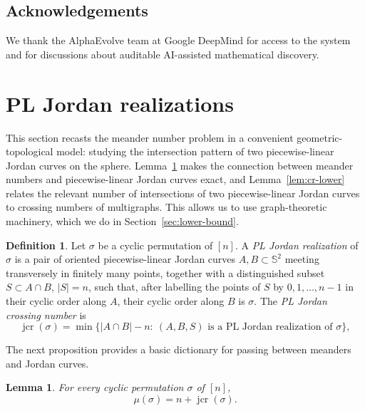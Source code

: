 \documentclass[11pt,a4paper]{amsart}
\newtheorem{lemma}[theorem]{Lemma}
\theoremstyle{definition}
\newtheorem{definition}[theorem]{Definition}
\theoremstyle{remark}
\DeclareMathOperator{\jcr}{jcr}
\begin{document}
\subsection*{Acknowledgements}

 We thank the AlphaEvolve team at Google DeepMind for access to the system and for discussions about auditable AI-assisted mathematical discovery.


\section{PL Jordan realizations}
\label{sec:pl-jordan}

This section recasts the meander number problem in a convenient geometric-topological model: studying the intersection pattern of two piecewise-linear Jordan curves on the sphere. Lemma~\ref{lem:exact} makes the connection between meander numbers and piecewise-linear Jordan curves exact, and Lemma~\ref{lem:cr-lower} relates the relevant number of intersections of two piecewise-linear Jordan curves to crossing numbers of multigraphs.  This allows us to use graph-theoretic machinery, which we do in Section~\ref{sec:lower-bound}.

\begin{definition}
Let $\sigma$ be a cyclic permutation of $[n]$.  A \emph{PL Jordan
realization} of $\sigma$ is a pair of oriented piecewise-linear Jordan
curves $A,B\subset \mathbb{S}^2$ meeting transversely in finitely many points, together with a distinguished
subset $S\subset A\cap B$, $|S|=n$,
such that, after labelling the points of $S$ by $0,1,\ldots,n-1$ in
their cyclic order along $A$, their cyclic order along $B$ is $\sigma$. The \emph{PL Jordan crossing number} is
\begin{equation}
        \jcr(\sigma)
        =
        \min\{|A\cap B|-n:\ (A,B,S)\text{ is a PL Jordan realization of }
        \sigma\},
\end{equation}
\end{definition}

The next proposition provides a basic dictionary for passing between meanders and Jordan curves.
\begin{lemma}\label{lem:exact}
For every cyclic permutation $\sigma$ of $[n]$,
\begin{equation}
        \mu(\sigma)=n+\jcr(\sigma).
\end{equation}
\end{lemma}
\end{document}
